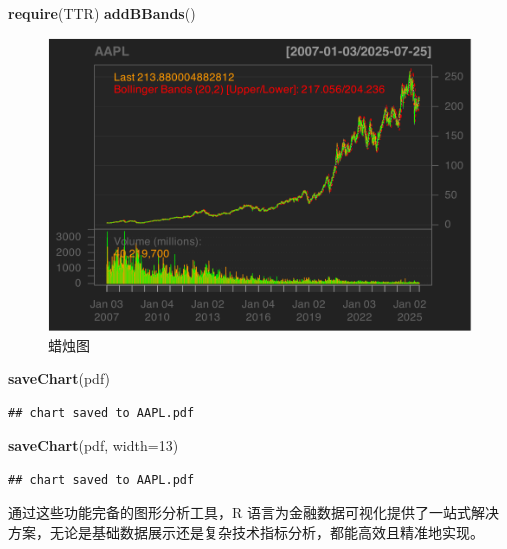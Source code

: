 \documentclass[]{ctexbook}
\newenvironment{Shaded}{\begin{snugshade}}{\end{snugshade}}
\newcommand{\AttributeTok}[1]{\textcolor[rgb]{0.13,0.29,0.53}{#1}}
\newcommand{\DecValTok}[1]{\textcolor[rgb]{0.00,0.00,0.81}{#1}}
\newcommand{\FunctionTok}[1]{\textcolor[rgb]{0.13,0.29,0.53}{\textbf{#1}}}
\newcommand{\NormalTok}[1]{#1}
\newcommand{\StringTok}[1]{\textcolor[rgb]{0.31,0.60,0.02}{#1}}
\begin{document}
\begin{Shaded}
\begin{Highlighting}[]
\FunctionTok{require}\NormalTok{(TTR)}
\FunctionTok{addBBands}\NormalTok{()}
\end{Highlighting}
\end{Shaded}

\begin{figure}
\includegraphics[width=0.9\linewidth]{QuantmodHandbook_files/figure-latex/savePdf-2} \caption{蜡烛图}\label{fig:savePdf-2}
\end{figure}

\begin{Shaded}
\begin{Highlighting}[]
\FunctionTok{saveChart}\NormalTok{(}\StringTok{\textquotesingle{}pdf\textquotesingle{}}\NormalTok{)}
\end{Highlighting}
\end{Shaded}

\begin{verbatim}
## chart saved to AAPL.pdf
\end{verbatim}

\begin{Shaded}
\begin{Highlighting}[]
\FunctionTok{saveChart}\NormalTok{(}\StringTok{\textquotesingle{}pdf\textquotesingle{}}\NormalTok{, }\AttributeTok{width=}\DecValTok{13}\NormalTok{)}
\end{Highlighting}
\end{Shaded}

\begin{verbatim}
## chart saved to AAPL.pdf
\end{verbatim}

通过这些功能完备的图形分析工具，R 语言为金融数据可视化提供了一站式解决方案，无论是基础数据展示还是复杂技术指标分析，都能高效且精准地实现。
\end{document}
